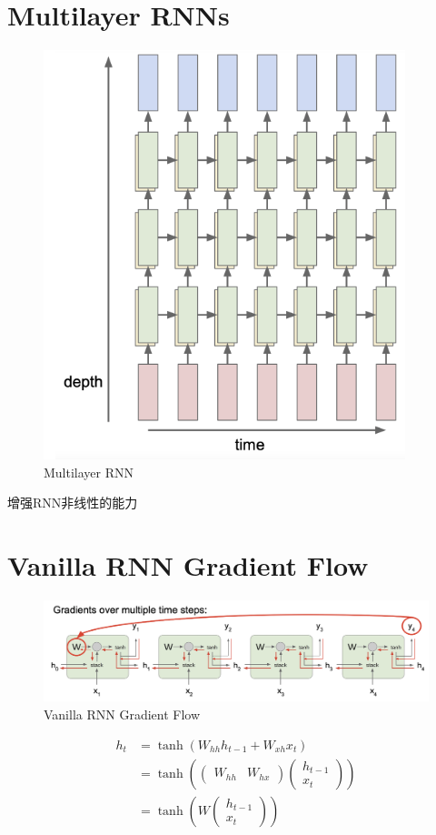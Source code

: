 	\section{Multilayer RNNs}
	\begin{figure}[htbp]
		\centering
		\includegraphics[scale=0.35]{figures/multilayer_rnn.png}
		\caption{Multilayer RNN}
	\end{figure}

	增强RNN非线性的能力
	
	\section{Vanilla RNN Gradient Flow}

	\begin{figure}[H]
		\centering
		\includegraphics[scale=0.3]{figures/RNN_grad_van.png}
		\caption{Vanilla RNN Gradient Flow}
	\end{figure}

	\[
	\begin{aligned}
		h_{t}& =\tanh(W_{hh}h_{t-1}+W_{xh}x_{t})  \\
		&=\tanh\left(\begin{pmatrix}W_{hh}&W_{hx}\end{pmatrix}\begin{pmatrix}h_{t-1}\\x_t\end{pmatrix}\right) \\
		&=\tanh\left(W\begin{pmatrix}h_{t-1}\\x_t\end{pmatrix}\right)
		\end{aligned}	
	\]
	

